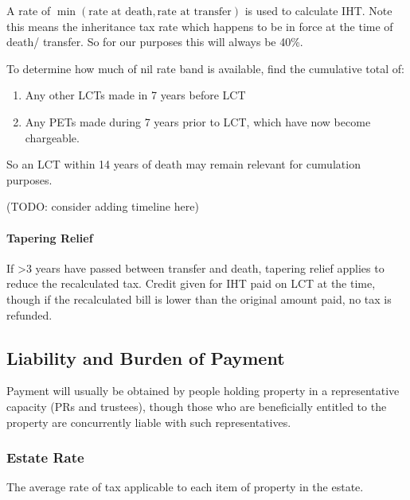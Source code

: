 \documentclass[
]{article}
\newenvironment{Shaded}{}{}
\newcommand{\NormalTok}[1]{#1}
\providecommand{\tightlist}{%
  \setlength{\itemsep}{0pt}\setlength{\parskip}{0pt}}
\begin{document}
A rate of
\(\min \left(\text{rate at death}, \text{rate at transfer}\right)\) is
used to calculate IHT. Note this means the inheritance tax rate which
happens to be in force at the time of death/ transfer. So for our
purposes this will always be 40\%.

To determine how much of nil rate band is available, find the cumulative
total of:

\begin{enumerate}
\def\labelenumi{\arabic{enumi}.}
\tightlist
\item
  Any other LCTs made in 7 years before LCT
\item
  Any PETs made during 7 years prior to LCT, which have now become
  chargeable.
\end{enumerate}

So an LCT within 14 years of death may remain relevant for cumulation
purposes.

(TODO: consider adding timeline here)

\hypertarget{tapering-relief-1}{%
\paragraph{Tapering Relief}\label{tapering-relief-1}}

If \textgreater3 years have passed between transfer and death, tapering
relief applies to reduce the recalculated tax. Credit given for IHT paid
on LCT at the time, though if the recalculated bill is lower than the
original amount paid, no tax is refunded.

\hypertarget{liability-and-burden-of-payment}{%
\subsection{Liability and Burden of
Payment}\label{liability-and-burden-of-payment}}

Payment will usually be obtained by people holding property in a
representative capacity (PRs and trustees), though those who are
beneficially entitled to the property are concurrently liable with such
representatives.

\hypertarget{estate-rate}{%
\subsubsection{Estate Rate}\label{estate-rate}}

\begin{Shaded}
\begin{Highlighting}[]
\NormalTok{The average rate of tax applicable to each item of property in the estate.}
\end{Highlighting}
\end{Shaded}
\end{document}
